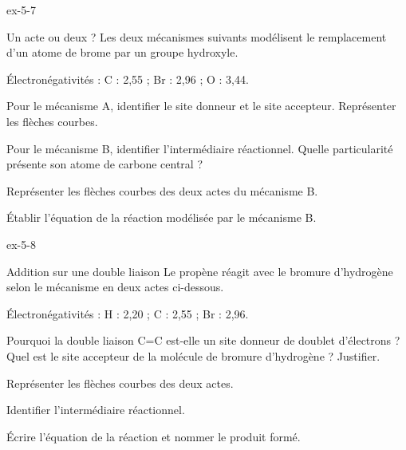 \begin{blocLivre}{ex-5-7}
\begin{exercice}[2]{Un acte ou deux ?}
Les deux mécanismes suivants modélisent le remplacement d'un atome de brome par un groupe hydroxyle.
\begin{donnees}
Électronégativités : C : 2,55 ; Br : 2,96 ; O : 3,44.
\end{donnees}
\begin{questions}
\item Pour le mécanisme A, identifier le site donneur et le site accepteur. Représenter les flèches courbes.
\item Pour le mécanisme B, identifier l'intermédiaire réactionnel. Quelle particularité présente son atome de carbone central ?
\item Représenter les flèches courbes des deux actes du mécanisme B.
\item Établir l'équation de la réaction modélisée par le mécanisme B.
\end{questions}
\end{exercice}
\end{blocLivre}
\begin{blocLivre}{ex-5-8}
\begin{exercice}[2]{Addition sur une double liaison}
Le propène réagit avec le bromure d'hydrogène selon le mécanisme en deux actes ci-dessous.
\begin{donnees}
Électronégativités : H : 2,20 ; C : 2,55 ; Br : 2,96.
\end{donnees}
\begin{questions}
\item Pourquoi la double liaison C=C est-elle un site donneur de doublet d'électrons ? Quel est le site accepteur de
la molécule de bromure d'hydrogène ? Justifier.
\item Représenter les flèches courbes des deux actes.
\item Identifier l'intermédiaire réactionnel.
\item Écrire l'équation de la réaction et nommer le produit formé.
\end{questions}
\end{exercice}
\end{blocLivre}
